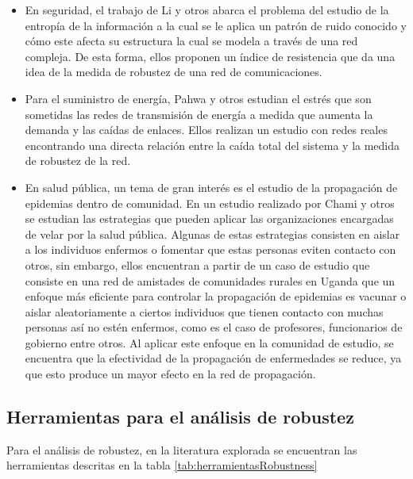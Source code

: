 \begin{itemize}
    \item En seguridad, el trabajo de Li y otros\cite{Li2016} abarca el problema del estudio de la entropía de la información a la cual se le aplica un patrón de ruido conocido y cómo este afecta su estructura la cual se modela a través de una red compleja. De esta forma, ellos proponen un índice de resistencia que da una idea de la medida de robustez de una red de comunicaciones.
    \item Para el suministro de energía, Pahwa y otros\cite{Pahwa2014} estudian el estrés que son sometidas las redes de transmisión de energía a medida que aumenta la demanda y las caídas de enlaces. Ellos realizan un estudio con redes reales encontrando una directa relación entre la caída total del sistema y la medida de robustez de la red.
    \item En salud pública, un tema de gran interés es el estudio de la propagación de epidemias dentro de comunidad. En un estudio realizado por Chami y otros\cite{Chami2017} se estudian las estrategias que pueden aplicar las organizaciones encargadas de velar por la salud pública. Algunas de estas estrategias consisten en aislar a los individuos enfermos o fomentar que estas personas eviten contacto con otros, sin embargo, ellos encuentran a partir de un caso de estudio que consiste en una red de amistades de comunidades rurales en Uganda que un enfoque más eficiente para controlar la propagación de epidemias es vacunar o aislar aleatoriamente a ciertos individuos que tienen contacto con muchas personas así no estén enfermos, como es el caso de profesores, funcionarios de gobierno entre otros. Al aplicar este enfoque en la comunidad de estudio, se encuentra que la efectividad de la propagación de enfermedades se reduce, ya que esto produce un mayor efecto en la red de propagación.
\end{itemize}


\subsection{Herramientas para el análisis de robustez}

Para el análisis de robustez, en la literatura explorada se encuentran las herramientas descritas en la tabla \ref{tab:herramientasRobustness}

